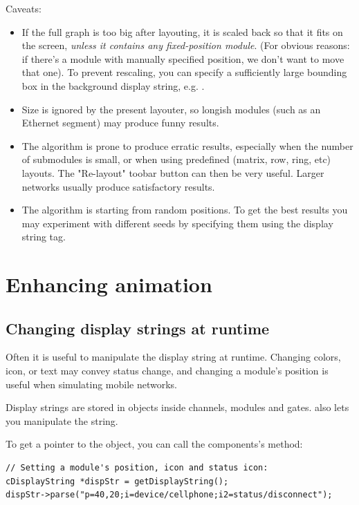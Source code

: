 Caveats:

\begin{itemize}
  \item If the full graph is too big after layouting, it is scaled
    back so that it fits on the screen, \textit{unless it contains
    any fixed-position module}. (For obvious reasons: if there's a module
    with manually specified position, we don't want to move that one).
    To prevent rescaling, you can specify a sufficiently large bounding
    box in the background display string, e.g. .
  \item Size is ignored by the present layouter, so longish modules
    (such as an Ethernet segment) may produce funny results.
  \item The algorithm is prone to produce erratic results, especially
    when the number of submodules is small, or when using predefined
    (matrix, row, ring, etc) layouts. The "Re-layout" toobar button
    can then be very useful. Larger networks usually produce
    satisfactory results.
  \item The algorithm is starting from random positions. 
     To get the best results you may experiment with
    different seeds by specifying them using the 
    display string tag. 
\end{itemize}

\section{Enhancing animation}

\subsection{Changing display strings at runtime}

Often it is useful to manipulate the display string at runtime.
Changing colors, icon, or text may convey status change, and
changing a module's position is useful when simulating mobile
networks.

Display strings are stored in  objects inside
channels, modules and gates.  also lets you 
manipulate the string.

To get a pointer to the  object, you can call
the components's  method:

\begin{verbatim}
// Setting a module's position, icon and status icon:
cDisplayString *dispStr = getDisplayString();
dispStr->parse("p=40,20;i=device/cellphone;i2=status/disconnect");
\end{verbatim}

